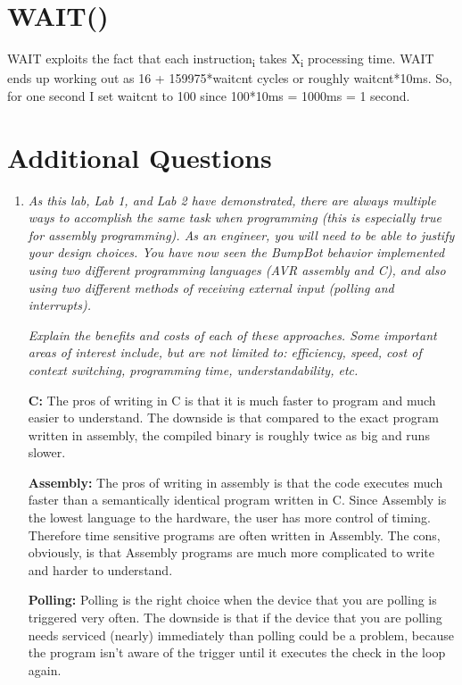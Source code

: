 \documentclass[12pt,letterpaper]{article}
\begin{document}
	
\section{WAIT()}
	WAIT exploits the fact that each instruction\textsubscript{i} takes X\textsubscript{i} processing time.
	WAIT ends up working out as 16 + 159975*waitcnt cycles or roughly waitcnt*10ms.
	So, for one second I set waitcnt to 100 since 100*10ms = 1000ms = 1 second.

\section{Additional Questions}
\begin{enumerate}
    \item
	\textit{As this lab, Lab 1, and Lab 2 have demonstrated, there are always multiple ways to accomplish the same task when programming (this is especially true for assembly programming).
	As an engineer, you will need to be able to justify your design choices. 
	You have now seen the BumpBot behavior implemented using two different programming languages (AVR assembly and C), and also using two different methods of receiving external input
	(polling and interrupts).}

	\textit{Explain the benefits and costs of each of these approaches.
	Some important areas of interest include, but are not limited to: efficiency, speed, cost of context switching, programming time, understandability, etc.}

	\textbf{C:} The pros of writing in C is that it is much faster to program and much easier to understand.
	The downside is that compared to the exact program written in assembly, the compiled binary is roughly twice as big and runs slower.
	
	\textbf{Assembly:} The pros of writing in assembly is that the code executes much faster than a semantically identical program written in C.
	Since Assembly is the lowest language to the hardware, the user has more control of timing.
	Therefore time sensitive programs are often written in Assembly.
	The cons, obviously, is that Assembly programs are much more complicated to write and harder to understand.
	
	\textbf{Polling:} Polling is the right choice when the device that you are polling is triggered very often.
	The downside is that if the device that you are polling needs serviced (nearly) immediately than polling could be a problem, because the program isn't aware of the trigger until it executes the check in the loop again.
	

\end{enumerate}
\end{document}
